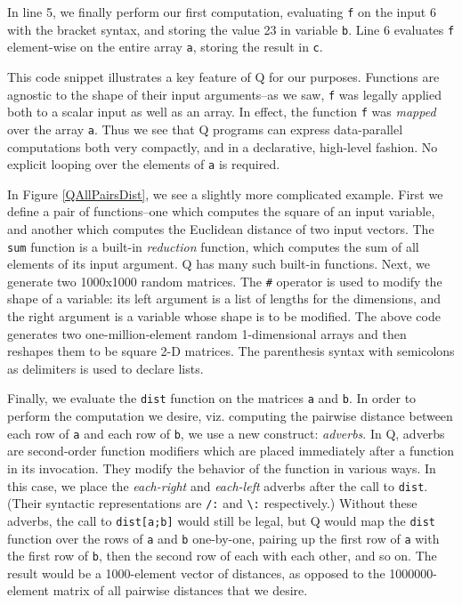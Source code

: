 \documentclass[preprint]{sigplanconf}
\begin{document}
In line 5, we finally perform our first computation, evaluating \texttt{f} on the input 6 with the bracket syntax, and storing the value 23 in variable \texttt{b}.  Line 6 evaluates \texttt{f} element-wise on the entire array \texttt{a}, storing the result in \texttt{c}.

This code snippet illustrates a key feature of Q for our purposes.  Functions are agnostic to the shape of their input arguments--as we saw, \texttt{f} was legally applied both to a scalar input as well as an array.  In effect, the function \texttt{f} was {\it mapped} over the array \texttt{a}.  Thus we see that Q programs can express data-parallel computations both very compactly, and in a declarative, high-level fashion.  No explicit looping over the elements of \texttt{a} is required.

In Figure \ref{QAllPairsDist}, we see a slightly more complicated example.  First we define a pair of functions--one which computes the square of an input variable, and another which computes the Euclidean distance of two input vectors.  The \texttt{sum} function is a built-in {\it reduction} function, which computes the sum of all elements of its input argument.  Q has many such built-in functions.  Next, we generate two 1000x1000 random matrices.  The \texttt{\#} operator is used to modify the shape of a variable: its left argument is a list of lengths for the dimensions, and the right argument is a variable whose shape is to be modified.  The above code generates two one-million-element random 1-dimensional arrays and then reshapes them to be square 2-D matrices.  The parenthesis syntax with semicolons as delimiters is used to declare lists.

Finally, we evaluate the \texttt{dist} function on the matrices \texttt{a} and \texttt{b}.  In order to perform the computation we desire, viz. computing the pairwise distance between each row of \texttt{a} and each row of \texttt{b}, we use a new construct: {\it adverbs}.  In Q, adverbs are second-order function modifiers which are placed immediately after a function in its invocation.  They modify the behavior of the function in various ways.  In this case, we place the {\it each-right} and {\it each-left} adverbs after the call to \texttt{dist}.  (Their syntactic representations are \texttt{/:} and \texttt{\textbackslash:} respectively.)  Without these adverbs, the call to \texttt{dist[a;b]} would still be legal, but Q would map the \texttt{dist} function over the rows of \texttt{a} and \texttt{b} one-by-one, pairing up the first row of \texttt{a} with the first row of \texttt{b}, then the second row of each with each other, and so on.  The result would be a 1000-element vector of distances, as opposed to the 1000000-element matrix of all pairwise distances that we desire.
\end{document}
